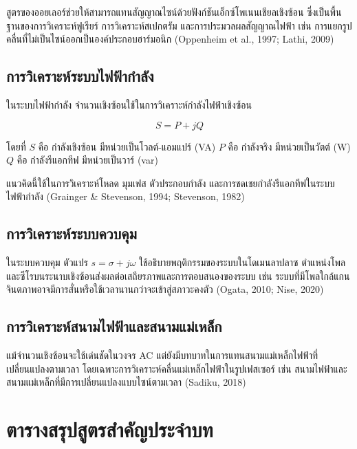 สูตรของออยเลอร์ช่วยให้สามารถแทนสัญญาณไซน์ด้วยฟังก์ชันเอ็กซ์โพเนนเชียลเชิงซ้อน ซึ่งเป็นพื้นฐานของการวิเคราะห์ฟูเรียร์ การวิเคราะห์สเปกตรัม และการประมวลผลสัญญาณไฟฟ้า เช่น การแยกรูปคลื่นที่ไม่เป็นไซน์ออกเป็นองค์ประกอบฮาร์มอนิก (Oppenheim et al., 1997; Lathi, 2009)

\subsection{การวิเคราะห์ระบบไฟฟ้ากำลัง}

ในระบบไฟฟ้ากำลัง จำนวนเชิงซ้อนใช้ในการวิเคราะห์กำลังไฟฟ้าเชิงซ้อน

\[
S=P+jQ
\]

โดยที่  
$S$ คือ กำลังเชิงซ้อน มีหน่วยเป็นโวลต์-แอมแปร์ (VA)  
$P$ คือ กำลังจริง มีหน่วยเป็นวัตต์ (W)  
$Q$ คือ กำลังรีแอกทีฟ มีหน่วยเป็นวาร์ (var)

แนวคิดนี้ใช้ในการวิเคราะห์โหลด มุมเฟส ตัวประกอบกำลัง และการชดเชยกำลังรีแอกทีฟในระบบไฟฟ้ากำลัง (Grainger \& Stevenson, 1994; Stevenson, 1982)

\subsection{การวิเคราะห์ระบบควบคุม}

ในระบบควบคุม ตัวแปร $s=\sigma+j\omega$ ใช้อธิบายพฤติกรรมของระบบในโดเมนลาปลาซ ตำแหน่งโพลและซีโรบนระนาบเชิงซ้อนส่งผลต่อเสถียรภาพและการตอบสนองของระบบ เช่น ระบบที่มีโพลใกล้แกนจินตภาพอาจมีการสั่นหรือใช้เวลานานกว่าจะเข้าสู่สภาวะคงตัว (Ogata, 2010; Nise, 2020)

\subsection{การวิเคราะห์สนามไฟฟ้าและสนามแม่เหล็ก}

แม้จำนวนเชิงซ้อนจะใช้เด่นชัดในวงจร AC แต่ยังมีบทบาทในการแทนสนามแม่เหล็กไฟฟ้าที่เปลี่ยนแปลงตามเวลา โดยเฉพาะการวิเคราะห์คลื่นแม่เหล็กไฟฟ้าในรูปเฟสเซอร์ เช่น สนามไฟฟ้าและสนามแม่เหล็กที่มีการเปลี่ยนแปลงแบบไซน์ตามเวลา (Sadiku, 2018)

\section{ตารางสรุปสูตรสำคัญประจำบท}

